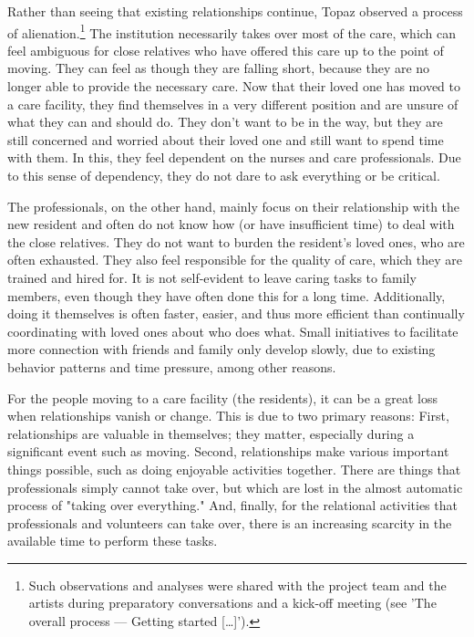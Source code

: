 \documentclass[authordate, empirical,issue]{jote-new-article}
\begin{document}
	Rather than seeing that existing relationships continue, Topaz observed a process of alienation.\footnote{ Such observations and analyses were shared with the project team and the artists during preparatory conversations and a kick-off meeting (see 'The overall process --- Getting started […]').} The institution necessarily takes over most of the care, which can feel ambiguous for close relatives who have offered this care up to the point of moving. They can feel as though they are falling short, because they are no longer able to provide the necessary care. Now that their loved one has moved to a care facility, they find themselves in a very different position and are unsure of what they can and should do. They don't want to be in the way, but they are still concerned and worried about their loved one and still want to spend time with them. In this, they feel dependent on the nurses and care professionals. Due to this sense of dependency, they do not dare to ask everything or be critical.







	The professionals, on the other hand, mainly focus on their relationship with the new resident and often do not know how (or have insufficient time) to deal with the close relatives. They do not want to burden the resident's loved ones, who are often exhausted. They also feel responsible for the quality of care, which they are trained and hired for. It is not self-evident to leave caring tasks to family members, even though they have often done this for a long time. Additionally, doing it themselves is often faster, easier, and thus more efficient than continually coordinating with loved ones about who does what. Small initiatives to facilitate more connection with friends and family only develop slowly, due to existing behavior patterns and time pressure, among other reasons.







	For the people moving to a care facility (the residents), it can be a great loss when relationships vanish or change. This is due to two primary reasons: First, relationships are valuable in themselves; they matter, especially during a significant event such as moving. Second, relationships make various important things possible, such as doing enjoyable activities together. There are things that professionals simply cannot take over, but which are lost in the almost automatic process of "taking over everything." And, finally, for the relational activities that professionals and volunteers can take over, there is an increasing scarcity in the available time to perform these tasks.
\end{document}
